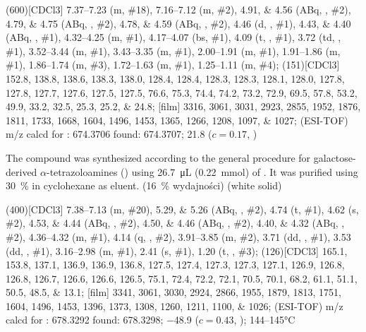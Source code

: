 \begin{fullexp}
	\NMR(600)[CDCl3] \numrange{7.37}{7.23} (m, \#{18}), \numrange{7.16}{7.12} (m, \#{2}), \numlist{4.91;4.56} (ABq, , \#{2}), \numlist{4.79;4.75} (ABq, , \#{2}), \numlist{4.78;4.59} (ABq, , \#{2}), \num{4.46} (d, , \#{1}), \numlist{4.43;4.40} (ABq, , \#{1}), \numrange{4.32}{4.25} (m, \#{1}), \numrange{4.17}{4.07} (bs, \#{1}), \num{4.09} (t, , \#{1}), \num{3.72} (td, , \#{1}), \numrange{3.52}{3.44} (m, \#{1}), \numrange{3.43}{3.35} (m, \#{1}), \numrange{2.00}{1.91} (m, \#{1}), \numrange{1.91}{1.86} (m, \#{1}), \numrange{1.86}{1.74} (m, \#{3}), \numrange{1.72}{1.63} (m, \#{1}), \numrange{1.25}{1.11} (m, \#{4});
	(151)[CDCl3] \numlist{152.8; 138.8; 138.6; 138.3; 138.0; 128.4; 128.4; 128.3; 128.3; 128.1; 128.0; 127.8; 127.8; 127.7; 127.6; 127.5; 127.5; 76.6; 75.3; 74.4; 74.2; 73.2; 72.9; 69.5; 57.8; 53.2; 49.9; 33.2; 32.5; 25.3; 25.2; 24.8};
	[film] \numlist{3316; 3061; 3031; 2923; 2855; 1952; 1876; 1811; 1733; 1668; 1604; 1496; 1453; 1365; 1266; 1208; 1097; 1027};
	 (ESI-TOF) m/z calcd for : \num{674.3706} found: \num{674.3707};
	\data{[$\alpha^{23}_D$]~$=$} \num{21.8} ($c = 0.17$, )
\end{fullexp}

The compound was synthesized according to the general procedure for galactose-derived $\alpha$-tetrazoloamines () using \SI{26.7}{\micro\liter} (\SI{0.22}{\milli\mol}) of .
It was purified using \SI{30}{\percent}  in cyclohexane as eluent.
(\SI{16}{\percent} wydajności) (white solid)

\begin{fullexp}
	\NMR(400)[CDCl3] \numrange{7.38}{7.13} (m, \#{20}), \numlist{5.29;5.26} (ABq, , \#{2}), \num{4.74} (t, \#{1}), \num{4.62} (s, \#{2}), \numlist{4.53;4.44} (ABq, , \#{2}), \numlist{4.50;4.46} (ABq, , \#{2}), \numlist{4.40;4.32} (ABq, , \#{2}), \numrange{4.36}{4.32} (m, \#{1}), \num{4.14} (q, , \#{2}), \numrange{3.91}{3.85} (m, \#{2}), \num{3.71} (dd, , \#{1}), \num{3.53} (dd, , \#{1}), \numrange{3.16}{2.98} (m, \#{1}), \num{2.41} (s, \#{1}), \num{1.20} (t, , \#{3});
	(126)[CDCl3] \numlist{165.1; 153.8; 137.1; 136.9; 136.9; 136.8; 127.5; 127.4; 127.3; 127.3; 127.1; 126.9; 126.8; 126.8; 126.7; 126.6; 126.6; 126.5; 75.1; 72.4; 72.2; 72.1; 70.5; 70.1; 68.2; 61.1; 51.1; 50.5; 48.5; 13.1};
	[film] \numlist{3341; 3061; 3030; 2924; 2866; 1955; 1879; 1813; 1751; 1604; 1496; 1453; 1396; 1373; 1308; 1260; 1211; 1100; 1026};
	 (ESI-TOF) m/z calcd for : \num{678.3292} found: \num{678.3298};
	\data{[$\alpha^{23}_D$]~$=$} \num{-48.9} ($c = 0.43$, );
	 \numrange{144}{145}\si{\celsius}
\end{fullexp}

